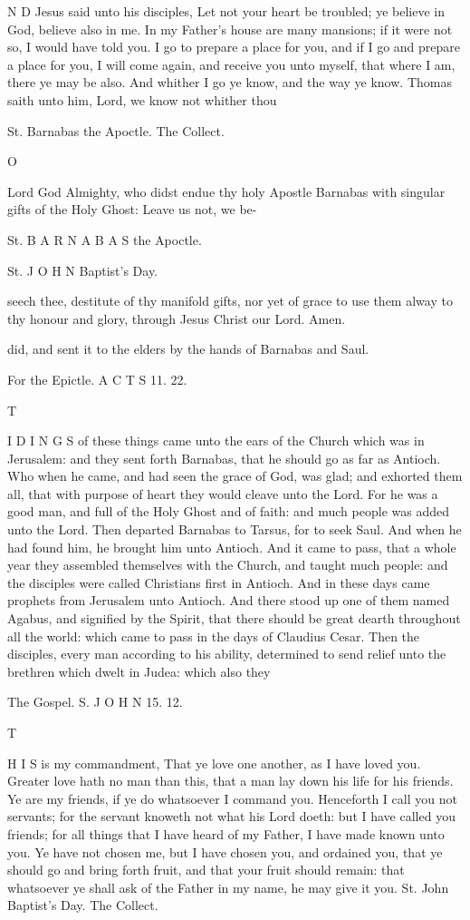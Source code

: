 N D Jesus said unto his disciples, Let not your heart be troubled; ye believe in God, believe also in me. In my Father’s house are many mansions; if it were not so, I would have told you. I go to prepare a place for you, and if I go and prepare a place for you, I will come again, and receive you unto myself, that where I am, there ye may be also. And whither I go ye know, and the way ye know. Thomas saith unto him, Lord, we know not whither thou

St. Barnabas the Apoctle. The Collect.

O

Lord God Almighty, who didst endue thy holy Apostle Barnabas with singular gifts of the Holy Ghost: Leave us not, we be-

St. B A R N A B A S the Apoctle.

St. J O H N Baptist’s Day.

seech thee, destitute of thy manifold gifts, nor yet of grace to use them alway to thy honour and glory, through Jesus Christ our Lord. Amen.

did, and sent it to the elders by the hands of Barnabas and Saul.

For the Epictle. A C T S 11. 22.

T

I D I N G S of these things came unto the ears of the Church which was in Jerusalem: and they sent forth Barnabas, that he should go as far as Antioch. Who when he came, and had seen the grace of God, was glad; and exhorted them all, that with purpose of heart they would cleave unto the Lord. For he was a good man, and full of the Holy Ghost and of faith: and much people was added unto the Lord. Then departed Barnabas to Tarsus, for to seek Saul. And when he had found him, he brought him unto Antioch. And it came to pass, that a whole year they assembled themselves with the Church, and taught much people: and the disciples were called Christians first in Antioch. And in these days came prophets from Jerusalem unto Antioch. And there stood up one of them named Agabus, and signified by the Spirit, that there should be great dearth throughout all the world: which came to pass in the days of Claudius Cesar. Then the disciples, every man according to his ability, determined to send relief unto the brethren which dwelt in Judea: which also they

The Gospel. S. J O H N 15. 12.

T

H I S is my commandment, That ye love one another, as I have loved you. Greater love hath no man than this, that a man lay down his life for his friends. Ye are my friends, if ye do whatsoever I command you. Henceforth I call you not servants; for the servant knoweth not what his Lord doeth: but I have called you friends; for all things that I have heard of my Father, I have made known unto you. Ye have not chosen me, but I have chosen you, and ordained you, that ye should go and bring forth fruit, and that your fruit should remain: that whatsoever ye shall ask of the Father in my name, he may give it you. St. John Baptist’s Day. The Collect.

